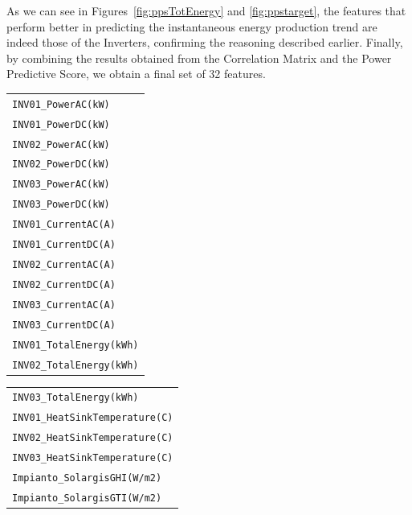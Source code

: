 As we can see in Figures~\ref{fig:ppsTotEnergy} and \ref{fig:ppstarget}, the features
that perform better in predicting the instantaneous energy production trend are
indeed those of the Inverters, confirming the reasoning described earlier.
Finally, by combining the results obtained from the Correlation Matrix and the
Power Predictive Score, we obtain a final set of 32 features.

%
\begin{table}[H]
	\begin{center}
		\begin{tabular}[t]{l|}
			\verb|INV01_PowerAC(kW)|      \\
			\verb|INV01_PowerDC(kW)|      \\
			\verb|INV02_PowerAC(kW)|      \\
			\verb|INV02_PowerDC(kW)|      \\
			\verb|INV03_PowerAC(kW)|      \\
			\verb|INV03_PowerDC(kW)|      \\
			\verb|INV01_CurrentAC(A)|     \\
			\verb|INV01_CurrentDC(A)|     \\
			\verb|INV02_CurrentAC(A)|     \\
			\verb|INV02_CurrentDC(A)|     \\
			\verb|INV03_CurrentAC(A)|     \\
			\verb|INV03_CurrentDC(A)|     \\
			\verb|INV01_TotalEnergy(kWh)| \\
			\verb|INV02_TotalEnergy(kWh)|
		\end{tabular}
		\begin{tabular}[t]{l|}
			\verb|INV03_TotalEnergy(kWh)|       \\
			\verb|INV01_HeatSinkTemperature(C)| \\
			\verb|INV02_HeatSinkTemperature(C)| \\
			\verb|INV03_HeatSinkTemperature(C)| \\
			\verb|Impianto_SolargisGHI(W/m2)|   \\
			\verb|Impianto_SolargisGTI(W/m2)|   \\

\end{tabular}
\end{center}
\end{table}
